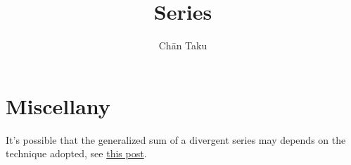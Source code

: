\documentclass{article}
\title{Series}
\author{Ch\=an Taku}
\begin{document}
\maketitle

\section*{Miscellany}

It's possible that the generalized sum of a divergent series may depends on the technique adopted, see \href{https://www.changhai.org/articles/science/mathematics/divergent_series.php}{this post}.

% 
% 
\end{document}
